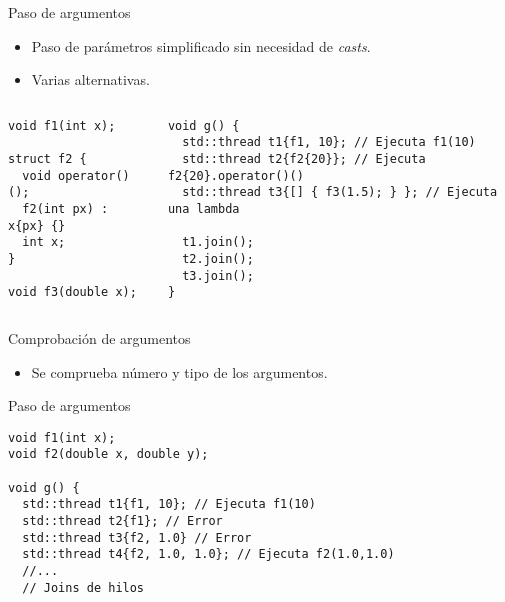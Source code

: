 \begin{frame}[t,fragile]{Paso de argumentos}
\begin{itemize}
  \item Paso de parámetros simplificado sin necesidad de \emph{casts}.
  \item Varias alternativas.
\end{itemize}

\begin{columns}[T]


\begin{lstlisting}
void f1(int x);

struct f2 {
  void operator()();
  f2(int px) : x{px} {}
  int x;
}

void f3(double x);
\end{lstlisting}

\begin{lstlisting}
void g() {
  std::thread t1{f1, 10}; // Ejecuta f1(10)
  std::thread t2{f2{20}}; // Ejecuta f2{20}.operator()()
  std::thread t3{[] { f3(1.5); } }; // Ejecuta una lambda

  t1.join();
  t2.join();
  t3.join();
}
\end{lstlisting}

\end{columns}

\end{frame}

\begin{frame}[t,fragile]{Comprobación de argumentos}
\begin{itemize}
  \item Se comprueba número y tipo de los argumentos.
\end{itemize}

\begin{block}{Paso de argumentos}
\begin{lstlisting}
void f1(int x);
void f2(double x, double y);

void g() {
  std::thread t1{f1, 10}; // Ejecuta f1(10)
  std::thread t2{f1}; // Error
  std::thread t3{f2, 1.0} // Error
  std::thread t4{f2, 1.0, 1.0}; // Ejecuta f2(1.0,1.0)
  //...
  // Joins de hilos
\end{lstlisting}
\end{block}
\end{frame}
